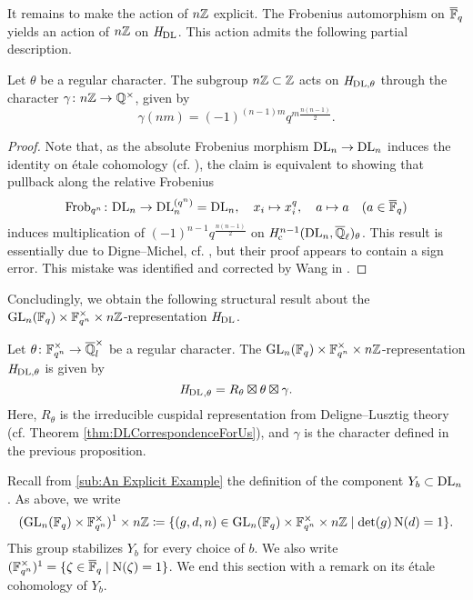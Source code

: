 \documentclass[../main.tex]{subfiles}
\begin{document}
It remains to make the action of $n\mathbb{Z}$ explicit. The Frobenius automorphism on
$\overline {\mathbb{F}}_q$ yields an action of $n\mathbb{Z}$ on $\hH_\DL$. This action admits the
following partial description.

\begin{prop}
  Let $\theta$ be a regular character. The subgroup $n\mathbb{Z} \subset \mathbb{Z}$ acts on
  $\mathit H_{\mathrm{DL},\theta}$ through the character $\gamma\colon 
  n\mathbb{Z} \to \mathbb{Q}^\times$, given by
  $$\gamma(nm) =  (-1)^{(n-1)m} q^{m \frac{n(n-1)}2}.$$
  \begin{proof}
    Note that, as the absolute Frobenius morphism $\mathrm{DL}_n \to \mathrm{DL}_n$
    induces the identity on \'etale cohomology (cf.
    \cite[\href{https://stacks.math.columbia.edu/tag/03SN}{Tag
    03SN}]{stacks-project}), the claim is equivalent to showing that pullback 
    along the relative Frobenius 
    \begin{equation*}
      \mathrm{Frob}_{q^n}\colon  \mathrm{DL}_n \to \mathrm{DL}_n^{(q^n)} = \mathrm{DL}_n, \quad
      x_i \mapsto x_i^q,\quad a \mapsto a \quad (a \in \overline {\mathbb{F}}_q)
    \end{equation*}
    induces multiplication of $(-1)^{n-1}q^{\frac{n(n-1)}2}$
    on $\mathit H_{\mathrm{c}}^{n-1}(\mathrm{DL}_n, \overline {\mathbb{Q}}_\ell)_\theta$. 
    This result is essentially due to Digne--Michel, cf. \cite[Remarque
    3.14]{digne1985fonctions}, but their proof appears to contain a sign error.
    This mistake was identified and corrected by Wang in \cite[Théorème
    3.1.12]{wang2014espace}.
  \end{proof}
\end{prop}

Concludingly, we obtain the following structural result about the 
$\operatorname{GL}_n(\mathbb{F}_q) \times \mathbb{F}_{q^n}^\times \times n\mathbb{Z}$-representation 
$\hH_\DL$.

\begin{thm}[Structure of $\hH_\DL$]\label{thm:MainThmHDlStructure}
  Let $\theta\colon  \mathbb{F}_{q^n}^\times \to \overline {\mathbb{Q}}_l^\times$ be a regular character.  
  The $\operatorname{GL}_n(\mathbb{F}_q) \times \mathbb{F}_{q^n}^\times \times n\mathbb{Z}$-representation
  $\mathit H_{\mathrm{DL}, \theta}$ is given by 
  \begin{equation*}
    {\mathit H_\mathrm{DL}}_{,\theta} = R_\theta \boxtimes \theta \boxtimes \gamma.
  \end{equation*}
  Here, $R_\theta$ is the irreducible cuspidal representation from
  Deligne--Lusztig theory (cf. Theorem \ref{thm:DLCorrespondenceForUs}), and
  $\gamma$ is the character defined in the previous proposition.
\end{thm}

Recall from \cref{sub:An Explicit Example} the definition
of the component $Y_b \subset \mathrm{DL}_n$. As above, we write
\begin{equation*}
  (\operatorname{GL}_n(\mathbb{F}_q) \times \mathbb{F}_{q^n}^\times)^1 \times n\mathbb{Z} 
  \coloneq \{(g,d,n) \in \operatorname{GL}_n(\mathbb{F}_q) \times \mathbb{F}_{q^n}^\times \times n\mathbb{Z} 
  \mid \det(g) \operatorname{N}(d) = 1\}.
\end{equation*}
This group stabilizes $Y_b$ for every choice of $b$. 
We also write $(\mathbb{F}_{q^n}^\times)^1 = \{\zeta \in {\overline{\mathbb{F}}_q} \mid \operatorname{N}(\zeta) =
1\}$. We end this section with a remark on its \'etale cohomology of $Y_b$.
\end{document}
